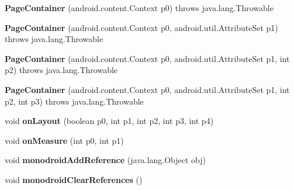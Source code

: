 \begin{DoxyCompactItemize}
\item 
\mbox{\label{classmd5b60ffeb829f638581ab2bb9b1a7f4f3f_1_1_page_container_a09eff7efc044cb7fe8bad3d17dcef2bf}} 
{\bfseries Page\+Container} (android.\+content.\+Context p0)  throws java.\+lang.\+Throwable 	
\item 
\mbox{\label{classmd5b60ffeb829f638581ab2bb9b1a7f4f3f_1_1_page_container_ad550ad5dcde007c81aaee8e4be4778c1}} 
{\bfseries Page\+Container} (android.\+content.\+Context p0, android.\+util.\+Attribute\+Set p1)  throws java.\+lang.\+Throwable 	
\item 
\mbox{\label{classmd5b60ffeb829f638581ab2bb9b1a7f4f3f_1_1_page_container_af875cc61d7fd276d67a7364fc9282d2b}} 
{\bfseries Page\+Container} (android.\+content.\+Context p0, android.\+util.\+Attribute\+Set p1, int p2)  throws java.\+lang.\+Throwable 	
\item 
\mbox{\label{classmd5b60ffeb829f638581ab2bb9b1a7f4f3f_1_1_page_container_aea67ff0782cec21a82e2017351bda69f}} 
{\bfseries Page\+Container} (android.\+content.\+Context p0, android.\+util.\+Attribute\+Set p1, int p2, int p3)  throws java.\+lang.\+Throwable 	
\item 
\mbox{\label{classmd5b60ffeb829f638581ab2bb9b1a7f4f3f_1_1_page_container_a163d7ce92b315c58198349b7f05f1a91}} 
void {\bfseries on\+Layout} (boolean p0, int p1, int p2, int p3, int p4)
\item 
\mbox{\label{classmd5b60ffeb829f638581ab2bb9b1a7f4f3f_1_1_page_container_a24278f432b2d8c0d9076c33f97a373e2}} 
void {\bfseries on\+Measure} (int p0, int p1)
\item 
\mbox{\label{classmd5b60ffeb829f638581ab2bb9b1a7f4f3f_1_1_page_container_a3221cf5a81133b548c2ee9f69f366643}} 
void {\bfseries monodroid\+Add\+Reference} (java.\+lang.\+Object obj)
\item 
\mbox{\label{classmd5b60ffeb829f638581ab2bb9b1a7f4f3f_1_1_page_container_a8480055a790d8945498bfcf3c95fc165}} 
void {\bfseries monodroid\+Clear\+References} ()
\end{DoxyCompactItemize}
